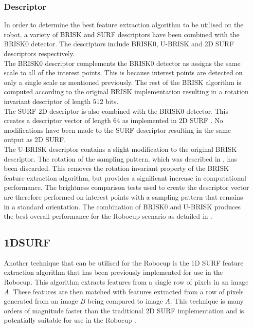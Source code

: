 \documentclass{article}
\begin{document}
\subsubsection{Descriptor}
\label{sec:BRISK0Describe}
In order to determine the best feature extraction algorithm to be utilised on the robot, a variety of BRISK and SURF descriptors have been combined with the BRISK0 detector. The descriptors include BRISK0, U-BRISK and 2D SURF descriptors respectively.\\

The BRISK0 descriptor complements the BRISK0 detector as assigns the same scale to all of the interest points. This is because interest points are detected on only a single scale as mentioned previously. The rest of the BRISK algorithm is computed according to the original BRISK implementation resulting in a rotation invariant descriptor of length $512$ bits\cite{Leutenegger2011}.\\

The SURF 2D descriptor is also combined with the BRISK0 detector. This creates a descriptor vector of length $64$ as implemented in 2D SURF \cite{Bay}. No modifications have been made to the SURF descriptor resulting in the same output as 2D SURF.\\ 

The U-BRISK descriptor contains a slight modification to the original BRISK descriptor. The rotation of the sampling pattern, which was described in , has been discarded. This removes the rotation invariant property of the BRISK feature extraction algorithm, but provides a significant increase in computational performance. The brightness comparison tests used to create the descriptor vector are therefore performed on interest points with a sampling pattern that remains in a standard orientation. The combination of BRISK0 and U-BRISK produces the best overall performance for the Robocup scenario as detailed in . \\

\subsection{1DSURF}
\label{sec:1dsurf}
Another technique that can be utilised for the Robocup is the 1D SURF feature extraction algorithm that has been previously implemented \cite{Anderson} for use in the Robocup. This algorithm extracts features from a single row of pixels in an image $A$. These features are then matched with features extracted from a row of pixels generated from an image $B$ being compared to image $A$. This technique is many orders of magnitude faster than the traditional 2D SURF implementation and is potentially suitable for use in the Robocup \cite{Anderson}.\\
\end{document}
